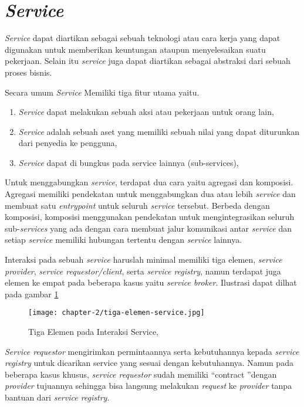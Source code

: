 \section{\textit{Service}}

\textit{Service} dapat diartikan sebagai sebuah teknologi atau cara kerja yang dapat digunakan untuk memberikan keuntungan ataupun menyelesaikan suatu pekerjaan. Selain itu \textit{service} juga dapat diartikan sebagai abstraksi dari sebuah proses bisnis. \parencite{osullivan2002}

Secara umum \textit{Service} Memiliki tiga fitur utama yaitu.
\begin{enumerate}
  \item \textit{Service} dapat melakukan sebuah aksi atau pekerjaan untuk orang lain,
  \item \textit{Service} adalah sebuah aset yang memiliki sebuah nilai yang dapat diturunkan dari penyedia ke pengguna,
  \item \textit{Service} dapat di bungkus pada service lainnya (sub-services),
\end{enumerate}

Untuk menggabungkan \textit{service}, terdapat dua cara yaitu agregasi dan komposisi. Agregasi memiliki pendekatan untuk menggabungkan dua atau lebih \textit{service} dan membuat satu \textit{entrypoint} untuk seluruh \textit{service} tersebut. Berbeda dengan komposisi, komposisi menggunakan pendekatan untuk mengintegrasikan seluruh sub-\textit{services} yang ada dengan cara membuat jalur komunikasi antar \textit{service} dan setiap \textit{service} memiliki hubungan tertentu dengan \textit{service} lainnya.

Interaksi pada sebuah \textit{service} haruslah minimal memiliki tiga elemen, \textit{service provider}, \textit{service requestor/client}, serta \textit{\textit{service registry}}, namun terdapat juga elemen ke empat pada beberapa kasus yaitu \textit{service broker}. Ilustrasi dapat dilhat pada gambar \ref{fig:tiga-elemen-service}

\begin{figure}[ht]
  \centering
  \texttt{[image: chapter-2/tiga-elemen-service.jpg]}
  \caption{Tiga Elemen pada Interaksi Service, \parencite{abugessaisa2023}}
  \label{fig:tiga-elemen-service}
\end{figure}

\textit{Service requestor} mengirimkan permintaannya serta kebutuhannya kepada \textit{service registry} untuk dicarikan service yang sesuai dengan kebutuhannya. Namun pada beberapa kasus khusus, \textit{service requestor}
sudah memiliki \textquotedblleft contract \textquotedblright dengan \textit{provider} tujuannya sehingga bisa langsung melakukan \textit{request} ke \textit{provider} tanpa bantuan dari \textit{service registry}.

